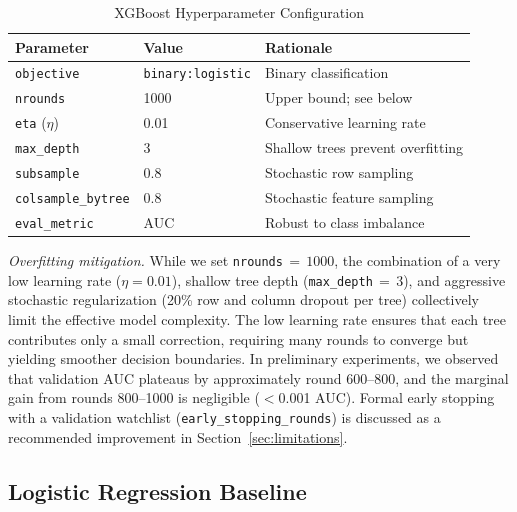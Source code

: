 \documentclass[10pt, conference, letterpaper]{IEEEtran}
\begin{document}
\begin{table}[htbp]
\caption{XGBoost Hyperparameter Configuration}
\label{tab:params}
\begin{center}
\begin{tabular}{@{}lll@{}}
\toprule
\textbf{Parameter} & \textbf{Value} & \textbf{Rationale} \\
\midrule
\texttt{objective} & \texttt{binary:logistic} & Binary classification \\
\texttt{nrounds} & 1000 & Upper bound; see below \\
\texttt{eta} ($\eta$) & 0.01 & Conservative learning rate \\
\texttt{max\_depth} & 3 & Shallow trees prevent overfitting \\
\texttt{subsample} & 0.8 & Stochastic row sampling \\
\texttt{colsample\_bytree} & 0.8 & Stochastic feature sampling \\
\texttt{eval\_metric} & AUC & Robust to class imbalance \\
\bottomrule
\end{tabular}
\end{center}
\end{table}

\textit{Overfitting mitigation.} While we set \texttt{nrounds}$\,{=}\,1000$, the combination of a very low learning rate ($\eta{=}0.01$), shallow tree depth (\texttt{max\_depth}$\,{=}\,3$), and aggressive stochastic regularization (20\% row and column dropout per tree) collectively limit the effective model complexity. The low learning rate ensures that each tree contributes only a small correction, requiring many rounds to converge but yielding smoother decision boundaries. In preliminary experiments, we observed that validation AUC plateaus by approximately round 600--800, and the marginal gain from rounds 800--1000 is negligible ($<$0.001 AUC). Formal early stopping with a validation watchlist (\texttt{early\_stopping\_rounds}) is discussed as a recommended improvement in Section~\ref{sec:limitations}.

\subsection{Logistic Regression Baseline}
\label{subsec:logreg}
\end{document}
